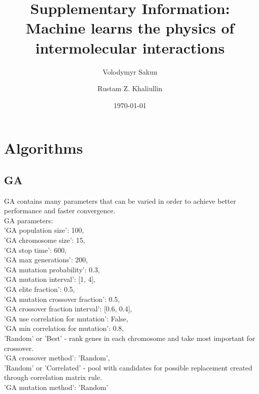\documentclass[aip,jcp,reprint,amsmath,amssymb,nature]{revtex4-1}
\begin{document}
\title{Supplementary Information:\\Machine learns the physics of intermolecular interactions}

\author{Volodymyr Sakun}
\author{Rustam Z. Khaliullin}

\maketitle
\date{\today}

\renewcommand{\thefigure}{S\arabic{figure}}

\section{Algorithms}

\subsection{GA}


GA contains many parameters that can be varied in order to achieve better performance and faster convergence.\\ 
GA parameters:\\
'GA population size': 100,\\
'GA chromosome size': 15,\\
'GA stop time': 600,\\
'GA max generations': 200,\\
'GA mutation probability': 0.3,\\
'GA mutation interval': [1, 4],\\
'GA elite fraction': 0.5,\\
'GA mutation crossover fraction': 0.5,\\
'GA crossover fraction interval': [0.6, 0.4],\\
'GA use correlation for mutation': False,\\
'GA min correlation for mutation': 0.8,\\
'Random' or 'Best' - rank genes in each chromosome and take most important for crossover.\\
'GA crossover method': 'Random',\\
'Random' or 'Correlated' - pool with candidates for possible replacement created through correlation matrix rule.\\
'GA mutation method': 'Random'\\
            
\end{document}

